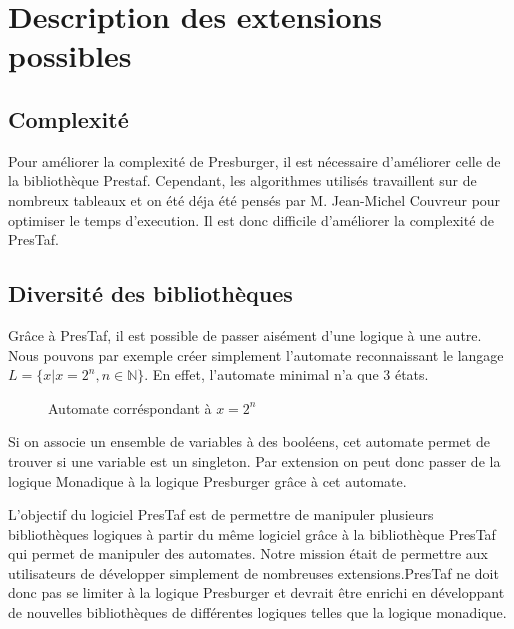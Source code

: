 \section{Description des extensions possibles}

\subsection{Complexité}

Pour améliorer la complexité de Presburger, il est nécessaire d'améliorer celle de la bibliothèque Prestaf. Cependant, les algorithmes utilisés travaillent sur de nombreux tableaux et on été déja été pensés par M. Jean-Michel Couvreur pour optimiser le temps d'execution. Il est donc difficile d'améliorer la complexité de PresTaf.

\subsection{Diversité des bibliothèques}

Grâce à PresTaf, il est possible de passer aisément d'une logique à une autre. Nous pouvons par exemple créer simplement l'automate reconnaissant le langage $L = \{x | x = 2^n, n \in \mathbb{N} \}$. En effet, l'automate minimal n'a que 3 états.

\begin{figure}[h]

\centering

\caption{Automate corréspondant à $x = 2^n$}
\end{figure}

Si on associe un ensemble de variables à des booléens, cet automate permet de trouver si une variable est un singleton. Par extension on peut donc passer de la logique Monadique à la logique Presburger grâce à cet automate.\\\par

L'objectif du logiciel PresTaf est de permettre de manipuler plusieurs bibliothèques logiques à partir du même logiciel grâce à la bibliothèque PresTaf qui permet de manipuler des automates. Notre mission était de permettre aux utilisateurs de développer simplement de nombreuses extensions.PresTaf ne doit donc pas se limiter à la logique Presburger et devrait être enrichi en développant de nouvelles bibliothèques de différentes logiques telles que la logique monadique. 
